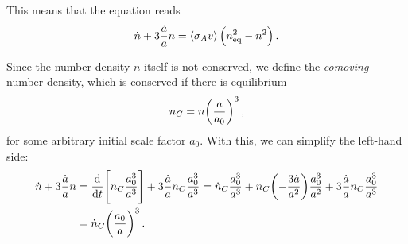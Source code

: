 \documentclass[main.tex]{subfiles}
\begin{document}

This means that the equation reads
%
\begin{align}
  \dot{n} + 3 \frac{\dot{a}}{a} n = \expval{\sigma_A v} \qty(n _{\text{eq}}^2 -  n^2)
\,.
\end{align}
%






Since the number density \(n\) itself is not conserved, we define the \emph{comoving} number density, which is conserved if there is equilibrium
%
\begin{align}
  n_C = n \qty(\frac{a}{a_0 })^3
\,,
\end{align}
%
for some arbitrary initial scale factor \(a_0 \).
With this, we can simplify the left-hand side: 
%
\begin{align}
  \dot{n} + 3 \frac{\dot{a}}{a} n 
  &= \dv{}{t} \qty[n_C \frac{a_0^3}{a^3}] + 3 \frac{\dot{a}}{a} n_C \frac{a_0^3}{a^3} = \dot{n}_C \frac{a_0^3}{a^3} 
  + n_C \qty(-\frac{3 \dot{a}}{a^2}) \frac{a_0^3}{a^2}
  + 3 \frac{\dot{a}}{a} n_C \frac{a_0^3}{a^3}  \\
  &= \dot{n}_C \qty(\frac{a_0 }{a})^3
\,.
\end{align}
\end{document}
